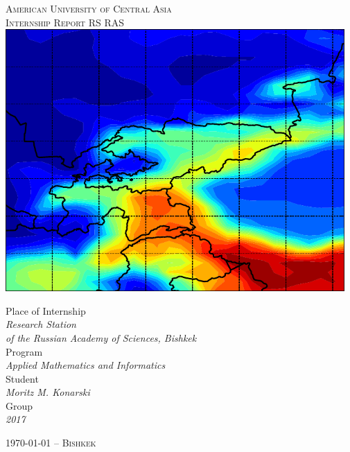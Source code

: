 \documentclass[a4paper, 12pt, reqno]{article}
\newcommand{\titl}{Internship Report RS RAS}
\newcommand{\auth}{Moritz M. Konarski}
\begin{document}
\thispagestyle{empty}
\begin{center}
    \Large
    \vspace{10pt}
    \textsc{American University of Central Asia}\\[10pt]
    \textsc{\titl{}}\\ [1.5cm]

    \includegraphics[height=10cm]{../graphics/title_pic}

    \vspace{1.5cm}

    \normalsize
    Place of Internship\\
    \textit{Research Station \\
    of the Russian Academy of Sciences, Bishkek}\\[10pt]

    Program\\
    \textit{Applied Mathematics and Informatics}\\[10pt]

    Student\\
    \textit{\auth{}}\\[10pt]

    Group\\
    \textit{2017}\\

    \vfill

    \large
    \textsc{\today{} -- Bishkek}
    \normalsize
\end{center}

\restoregeometry
\newpage
\end{document}
